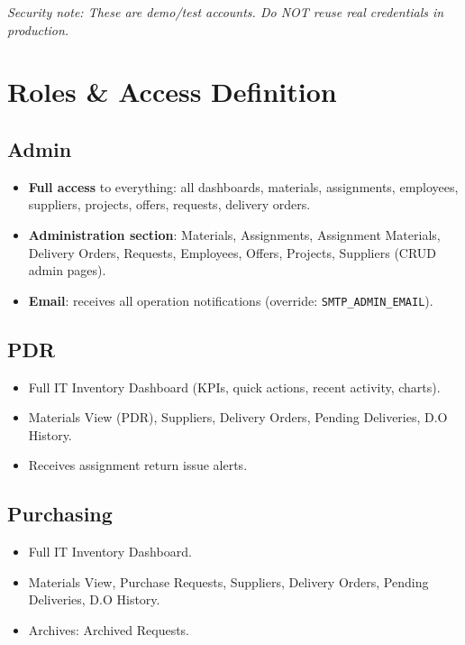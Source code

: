 \documentclass[11pt,a4paper]{article}
\begin{document}
\noindent\textit{Security note: These are demo/test accounts. Do NOT reuse real credentials in production.}

\section{Roles \& Access Definition}

\subsection{Admin}
\begin{itemize}
  \item \textbf{Full access} to everything: all dashboards, materials, assignments, employees, suppliers, projects, offers, requests, delivery orders.
  \item \textbf{Administration section}: Materials, Assignments, Assignment Materials, Delivery Orders, Requests, Employees, Offers, Projects, Suppliers (CRUD admin pages).
  \item \textbf{Email}: receives all operation notifications (override: \texttt{SMTP\_ADMIN\_EMAIL}).
\end{itemize}

\subsection{PDR}
\begin{itemize}
  \item Full IT Inventory Dashboard (KPIs, quick actions, recent activity, charts).
  \item Materials View (PDR), Suppliers, Delivery Orders, Pending Deliveries, D.O History.
  \item Receives assignment return issue alerts.
\end{itemize}

\subsection{Purchasing}
\begin{itemize}
  \item Full IT Inventory Dashboard.
  \item Materials View, Purchase Requests, Suppliers, Delivery Orders, Pending Deliveries, D.O History.
  \item Archives: Archived Requests.
\end{itemize}
\end{document}
